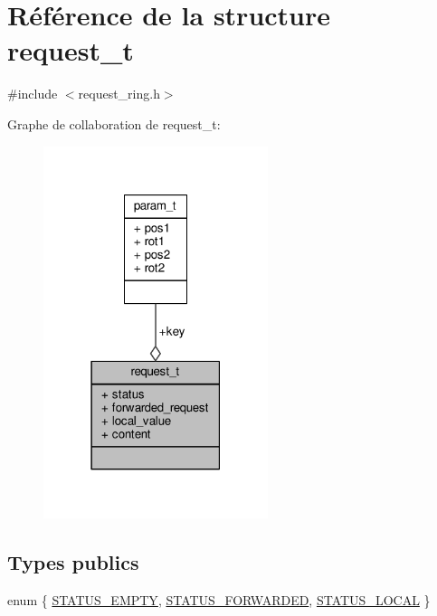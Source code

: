\hypertarget{structrequest__t}{\section{Référence de la structure request\+\_\+t}
\label{structrequest__t}
}


{\ttfamily \#include $<$request\+\_\+ring.\+h$>$}



Graphe de collaboration de request\+\_\+t\+:\nopagebreak
\begin{figure}[H]
\begin{center}
\leavevmode
\includegraphics[width=186pt]{structrequest__t__coll__graph}
\end{center}
\end{figure}
\subsection*{Types publics}
\begin{DoxyCompactItemize}
\item 
enum \{ \hyperlink{structrequest__t_aca0697afc961f559b2e88cf9c36230a9a1357877ac56fad2ccf5e936b88c44db0}{S\+T\+A\+T\+U\+S\+\_\+\+E\+M\+P\+T\+Y}, 
\hyperlink{structrequest__t_aca0697afc961f559b2e88cf9c36230a9a9827bd9303cad6afd9f28f4a7980fa95}{S\+T\+A\+T\+U\+S\+\_\+\+F\+O\+R\+W\+A\+R\+D\+E\+D}, 
\hyperlink{structrequest__t_aca0697afc961f559b2e88cf9c36230a9afede9eb5f5997a15e1b724938d00e9b8}{S\+T\+A\+T\+U\+S\+\_\+\+L\+O\+C\+A\+L}
 \}
\end{DoxyCompactItemize}
